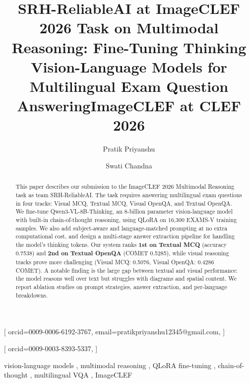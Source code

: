 \documentclass[]{ceurart}
\begin{document}


\title{SRH-ReliableAI at ImageCLEF 2026 Task on Multimodal Reasoning: Fine-Tuning Thinking Vision-Language Models for Multilingual Exam Question Answering}

\title[mode=sub]{ImageCLEF at CLEF 2026}

\author[1]{Pratik Priyanshu}[%
  orcid=0009-0006-6192-3767,
  email=pratikpriyanshu12345@gmail.com,
]
\address[1]{SRH University Heidelberg, Heidelberg, Germany}

\author[1]{Swati Chandna}[%
  orcid=0009-0003-8393-5337,
]


\begin{abstract}
This paper describes our submission to the ImageCLEF 2026 Multimodal Reasoning task as team SRH-ReliableAI.
The task requires answering multilingual exam questions in four tracks: Visual MCQ, Textual MCQ, Visual OpenQA, and Textual OpenQA.
We fine-tune Qwen3-VL-8B-Thinking, an 8-billion parameter vision-language model with built-in chain-of-thought reasoning, using QLoRA on 16,300 EXAMS-V training samples.
We also add subject-aware and language-matched prompting at no extra computational cost, and design a multi-stage answer extraction pipeline for handling the model's thinking tokens.
Our system ranks \textbf{1st on Textual MCQ} (accuracy 0.7538) and \textbf{2nd on Textual OpenQA} (COMET 0.5285), while visual reasoning tracks prove more challenging (Visual MCQ: 0.5076, Visual OpenQA: 0.4286 COMET).
A notable finding is the large gap between textual and visual performance: the model reasons well over text but struggles with diagrams and spatial content.
We report ablation studies on prompt strategies, answer extraction, and per-language breakdowns.
\end{abstract}

\begin{keywords}
  vision-language models \sep
  multimodal reasoning \sep
  QLoRA fine-tuning \sep
  chain-of-thought \sep
  multilingual VQA \sep
  ImageCLEF
\end{keywords}

\maketitle
\end{document}
